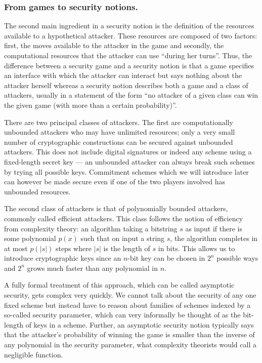 \documentclass[envcountsame]{llncs}
\begin{document}
\subsubsection{From games to security notions.}
The second main ingredient in a security notion is the definition of the
resources available to a hypothetical attacker. These resources are composed of
two factors: first, the moves available to the attacker in the game and
secondly, the computational resources that the attacker can use ``during her
turns''. Thus, the difference between a security game and a security notion is
that a game specifies an interface with which the attacker can interact but says
nothing about the attacker herself whereas a security notion describes both a
game and a class of attackers, usually in a statement of the form ``no attacker
of a given class can win the given game (with more than a certain probability)''.

There are two principal classes of attackers. The first are computationally
unbounded attackers who may have unlimited resources; only a very small number
of cryptographic constructions can be secured against unbounded attackers. This
does not include digital signatures or indeed any scheme using a fixed-length
secret key --- an unbounded attacker can always break such schemes by trying all
possible keys. Commitment schemes which we will introduce later can however be
made secure even if one of the two players involved has unbounded resources.

The second class of attackers is that of polynomially bounded attackers,
commonly called efficient attackers. This class follows the notion of efficiency
from complexity theory: an algorithm taking a bitstring $s$ as input if there is
some polynomial $p(x)$ such that on input a string $s$, the algorithm completes
in at most $p(|s|)$ steps where $|s|$ is the length of $s$ in bits. This allows
us to introduce cryptographic keys since an $n$-bit key can be chosen in $2^n$
possible ways and $2^n$ grows much faster than any polynomial in $n$.

A fully formal treatment of this approach, which can be called asymptotic
security, gets complex very quickly. We cannot talk about the security of any
one fixed scheme but instead have to reason about families of schemes indexed by
a so-called security parameter, which can very informally be thought of as the
bit-length of keys in a scheme. Further, an asymptotic security notion typically
says that the attacker's probability of winning the game is smaller than the
inverse of any polynomial in the security parameter, what complexity theorists
would call a negligible function\footnotemark.
\end{document}
